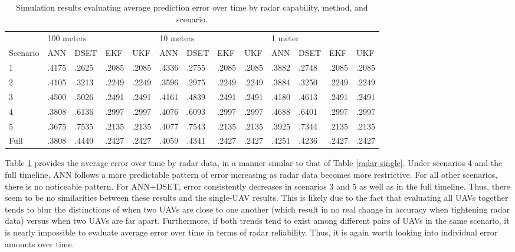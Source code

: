\documentclass[12pt]{uthesis-v12}  %
\begin{document}
\begin{table}[!t]
\caption{Simulation results evaluating average prediction error over time by radar capability, method, and scenario.}
\renewcommand{\arraystretch}{1.3}
\centering
\resizebox{\textwidth}{!}
{\begin{tabular}{*{13}{l}}
\toprule
& \multicolumn{4}{l}{100 meters} & \multicolumn{4}{l}{10 meters} & \multicolumn{4}{l}{1 meter} \\
Scenario & ANN & DSET & EKF & UKF & ANN & DSET & EKF & UKF & ANN & DSET & EKF & UKF \\ \midrule
1 & .4175 & .2625 & .2085 & .2085 & .4336 & .2755 & .2085 & .2085 & .3882 & .2748 & .2085 & .2085 \\
2 & .4105 & .3213 & .2249 & .2249 & .3596 & .2975 & .2249 & .2249 & .3884 & .3250 & .2249 & .2249 \\
3 & .4500 & .5026 & .2491 & .2491 & .4161 & .4839 & .2491 & .2491 & .4180 & .4613 & .2491 & .2491 \\
4 & .3808 & .6136 & .2997 & .2997 & .4076 & .6093 & .2997 & .2997 & .4688 & .6401 & .2997 & .2997 \\
5 & .3675 & .7535 & .2135 & .2135 & .4077 & .7543 & .2135 & .2135 & .3925 & .7344 & .2135 & .2135 \\
Full & .3808 & .4449 & .2427 & .2427 & .4059 & .4341 & .2427 & .2427 & .4251 & .4236 & .2427 & .2427 \\ \bottomrule
\end{tabular}}

\label{radar-multi}
\end{table}

Table \ref{radar-multi} provides the average error over time by radar data, in a manner similar to that of Table \ref{radar-single}. Under scenarios 4 and the full timeline, ANN follows a more predictable pattern of error increasing as radar data becomes more restrictive. For all other scenarios, there is no noticeable pattern. For ANN+DSET, error consistently decreases in scenarios 3 and 5 as well as in the full timeline. Thus, there seem to be no similarities between these results and the single-UAV results. This is likely due to the fact that evaluating all UAVs together tends to blur the distinctions of when two UAVs are close to one another (which result in no real change in accuracy when tightening radar data) versus when two UAVs are far apart. Furthermore, if both trends tend to exist among different pairs of UAVs in the same scenario, it is nearly impossible to evaluate average error over time in terms of radar reliability. Thus, it is again worth looking into individual error amounts over time.
\end{document}
